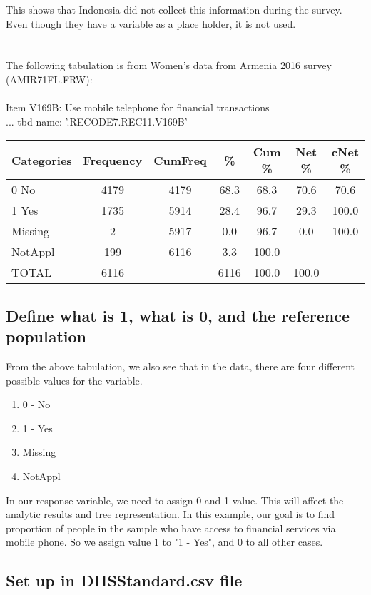 \documentclass[12pt]{article}
\begin{document}
This shows that Indonesia did not collect this information during the survey. Even though they have a variable as a place holder, it is not used.\\
\\
\\
The following tabulation is from Women's data from Armenia 2016 survey (AMIR71FL.FRW): \\
\\
Item V169B: Use mobile telephone for financial transactions\\
... tbd-name: '.RECODE7.REC11.V169B'\\
{\small 
\begin{tabular}{lcccccc}
\hline
 Categories & Frequency    &    CumFreq    &  \%   &  Cum  \%   &  Net \%  &  cNet \% \\
 \hline
 0 No   & 4179    &   4179   &  68.3   &  68.3  &   70.6  &   70.6 \\
 1 Yes  &  1735   &   5914   &  28.4   &  96.7   &  29.3  &   100.0 \\
 Missing &   2    &   5917    &  0.0    & 96.7   &   0.0   &   100.0 \\
 \hline
 NotAppl  &  199   &   6116    &  3.3  &  100.0   &    & \\  
 \hline    
 TOTAL &  6116  &  & 6116   &  100.0  &  100.0  &   \\
\end{tabular}
}

\subsection{Define what is 1, what is 0, and the reference population}

From the above tabulation, we also see that in the data, there are four different possible values for the variable.
\begin{enumerate}
\item 0 - No
\item 1 - Yes
\item Missing
\item NotAppl
\end{enumerate}

In our response variable, we need to assign 0 and 1 value. This will affect the analytic results and tree representation. In this example, our goal is to find proportion of people in the sample who have access to financial services via mobile phone. So we assign value 1 to "1 - Yes", and 0 to all other cases.
\subsection{Set up in DHSStandard.csv file}
\end{document}
